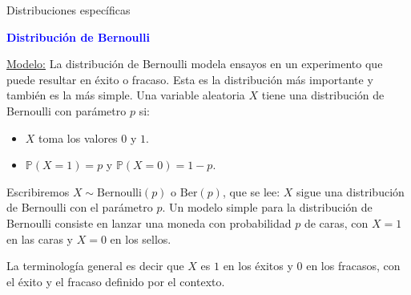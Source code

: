 \documentclass[10pt]{beamer}
\begin{document}
\begin{frame}{Distribuciones espec\'ificas}
	
\textbf{\textcolor{blue}{Distribuci\'on de Bernoulli}}

\underline{Modelo:}  La distribuci\'on de Bernoulli modela ensayos  en un experimento que puede resultar en \'exito o fracaso. Esta es la distribuci\'on m\'as importante y tambi\'en es la m\'as simple. Una variable aleatoria $X$ tiene una distribuci\'on de Bernoulli con  par\'ametro $p$ si:

\begin{itemize}
	\item $X$ toma los valores $0$ 	y $1$.
	\item $\mathbb{P}(X = 1) = p$ y $\mathbb{P}(X = 0 ) = 1- p$.
\end{itemize}


\vspace{0.5cm}


\scriptsize{Escribiremos $X \sim \text{Bernoulli}(p)$ o $\text{Ber}(p)$, que se lee: $X$ sigue una distribuci\'on de Bernoulli con el par\'ametro $p$. Un modelo simple para la distribuci\'on de Bernoulli consiste en lanzar  una moneda con probabilidad $p$ de caras, con $X = 1$ en las caras y $X = 0$ en los sellos. 
	
La terminolog\'ia general es decir que  $X$ es $1$ en los \'exitos y $0$ en los fracasos, con el \'exito y el fracaso definido por el contexto.
}
\end{frame}
\end{document}
